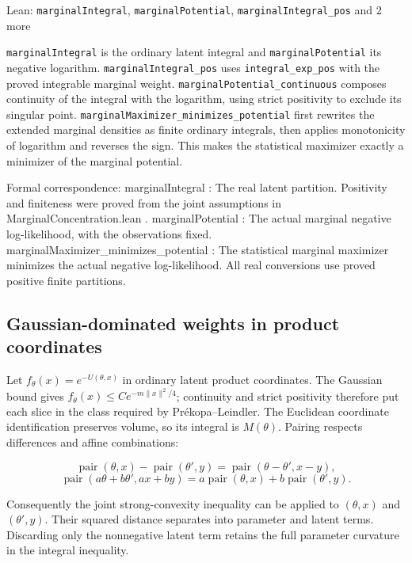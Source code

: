 \documentclass[11pt,a4paper]{report}
\newlength{\leancharwidth}
\newenvironment{leancode}{\par\smallskip\begingroup\ttfamily\footnotesize\raggedright
  \settowidth{\leancharwidth}{M}\setlength{\parskip}{0pt}\setlength{\parindent}{0pt}
  \frenchspacing}{\par\endgroup\smallskip}
\newcommand{\leanlabel}[1]{\par\smallskip\noindent{\small\bfseries #1}\par}
\begin{document}
\begin{leanbox}{Lean: \texttt{marginalIntegral}, \texttt{marginalPotential}, \texttt{marginalIntegral\_\allowbreak{}pos} and 2 more}
\begin{leancode}
\end{leancode}
\leanlabel{How the Lean proof follows the argument}
\texttt{marginal\allowbreak{}Integral} is the ordinary latent integral and \texttt{marginal\allowbreak{}Potential} its negative logarithm. \texttt{marginal\allowbreak{}Integral\_\allowbreak{}pos} uses \texttt{integral\_\allowbreak{}exp\_\allowbreak{}pos} with the proved integrable marginal weight. \texttt{marginal\allowbreak{}Potential\_\allowbreak{}continuous} composes continuity of the integral with the logarithm, using strict positivity to exclude its singular point. \texttt{marginal\allowbreak{}Maximizer\_\allowbreak{}minimizes\_\allowbreak{}potential} first rewrites the extended marginal densities as finite ordinary integrals, then applies monotonicity of logarithm and reverses the sign. This makes the statistical maximizer exactly a minimizer of the marginal potential.



Formal correspondence: marginalIntegral : The real latent partition. Positivity and finiteness were proved from the joint assumptions in MarginalConcentration.lean . marginalPotential : The actual marginal negative log-likelihood, with the observations fixed. marginalMaximizer\_minimizes\_potential : The statistical marginal maximizer minimizes the actual negative log-likelihood. All real conversions use proved positive finite partitions.
\end{leanbox}
\subsection{\texorpdfstring{Gaussian-dominated weights in product coordinates}{Gaussian-dominated weights in product coordinates}}
\label{report-step-IPLA-StrongLogConcavity-lean-2}


Let \(f_\theta(x)=e^{-U(\theta,x)}\) in ordinary latent product coordinates. The Gaussian bound gives \(f_\theta(x)\le Ce^{-m\|x\|^2/4}\); continuity and strict positivity therefore put each slice in the class required by Prékopa–Leindler. The Euclidean coordinate identification preserves volume, so its integral is \(M(\theta)\). Pairing respects differences and affine combinations:

\[\operatorname{pair}(\theta,x)-\operatorname{pair}(\theta',y)=\operatorname{pair}(\theta-\theta',x-y),\]\[\operatorname{pair}(a\theta+b\theta',ax+by)=a\operatorname{pair}(\theta,x)+b\operatorname{pair}(\theta',y).\]

Consequently the joint strong-convexity inequality can be applied to \((\theta,x)\) and \((\theta',y)\). Their squared distance separates into parameter and latent terms. Discarding only the nonnegative latent term retains the full parameter curvature in the integral inequality.
\end{document}
